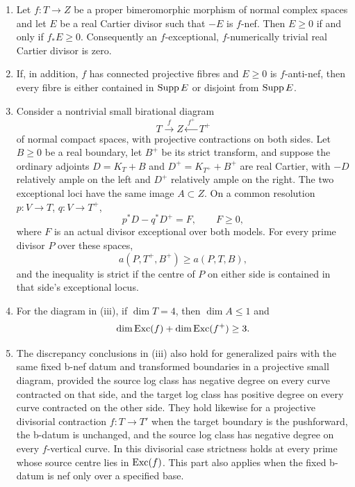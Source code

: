\begin{lemma}\label{lem:negativity}
\leavevmode
\begin{enumerate}[label=\textup{(\roman*)}]
\item Let $f:T\to Z$ be a proper bimeromorphic morphism of normal
complex spaces and let $E$ be a real Cartier divisor such that $-E$
is $f$-nef.  Then $E\geq0$ if and only if $f_*E\geq0$.
Consequently an $f$-exceptional, $f$-numerically trivial real Cartier
divisor is zero.
\item If, in addition, $f$ has connected projective fibres and
$E\geq0$ is $f$-anti-nef, then every fibre is either contained in
$\operatorname{Supp} E$ or disjoint from $\operatorname{Supp} E$.
\item Consider a nontrivial small birational diagram
\[
 T\xrightarrow{\ f\ }Z\xleftarrow{\ f^+\ }T^+
\]
of normal compact spaces, with projective contractions on both
sides.  Let $B\geq0$ be a real boundary, let $B^+$ be its strict
transform, and suppose the ordinary adjoints
$D=K_T+B$ and $D^+=K_{T^+}+B^+$ are real Cartier, with $-D$ relatively
ample on the left and $D^+$ relatively ample on the right.
The two exceptional loci have the same image $A\subset Z$.  On a
common resolution $p:V\to T$, $q:V\to T^+$,
\begin{equation}\label{eq:ordinary-flip-comparison}
 p^*D-q^*D^+=F,\qquad F\geq0,
\end{equation}
where $F$ is an actual divisor exceptional over both models.
For every prime divisor $P$ over these spaces,
\[
 a(P,T^+,B^+)\geq a(P,T,B),
\]
and the inequality is strict if the centre of $P$ on either side
is contained in that side's exceptional locus.
\item For the diagram in \textup{(iii)}, if $\dim T=4$, then $\dim A\leq1$ and
\[
 \dim\operatorname{Exc}(f)+\dim\operatorname{Exc}(f^+)\geq3.
\]
\item The discrepancy conclusions in \textup{(iii)} also hold for
generalized pairs with the same fixed b-nef datum and transformed
boundaries in a projective small diagram, provided the source log
class has negative degree on every curve contracted on that side,
and the target log class has positive degree on every curve
contracted on the other side.  They hold likewise for a projective divisorial
contraction $f:T\to T'$ when the target boundary is the pushforward,
the b-datum is unchanged, and the source log class has negative
degree on every $f$-vertical curve.  In this divisorial case strictness holds at every prime
whose source centre lies in $\operatorname{Exc}(f)$.
This part also applies when the fixed b-datum is nef only over a
specified base.
\end{enumerate}
\end{lemma}

